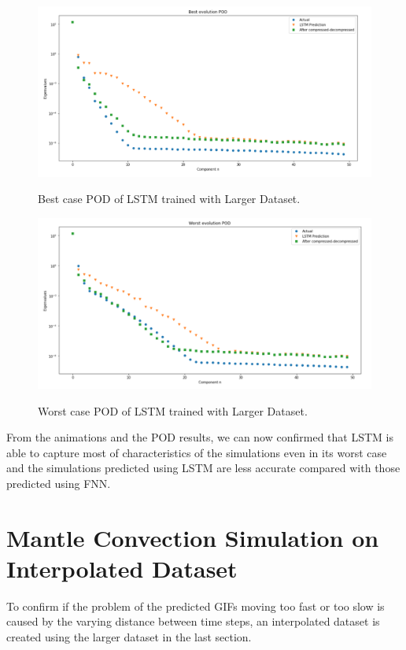 \begin{figure}[H]
    \caption{Best case POD of LSTM trained with Larger Dataset.}
    \includegraphics[scale=0.5]{figures/mantle_convection_images/larger_dataset/LSTM_Best_POD.png}
    \label{figure:LSTM_larger_best_POD}
\end{figure}

\begin{figure}[H]
    \caption{Worst case POD of LSTM trained with Larger Dataset.}
    \includegraphics[scale=0.5]{figures/mantle_convection_images/larger_dataset/LSTM_Worst_POD.png}
    \label{figure:LSTM_larger_worst_POD}
\end{figure}

From the animations and the POD results, we can now confirmed that LSTM is able to capture most of characteristics of the simulations even in its worst case and the simulations predicted using LSTM are less accurate compared with those predicted using FNN.


\section{Mantle Convection Simulation on Interpolated Dataset}

To confirm if the problem of the predicted GIFs moving too fast or too slow is caused by the varying distance between time steps, an interpolated dataset is created using the larger dataset in the last section.

